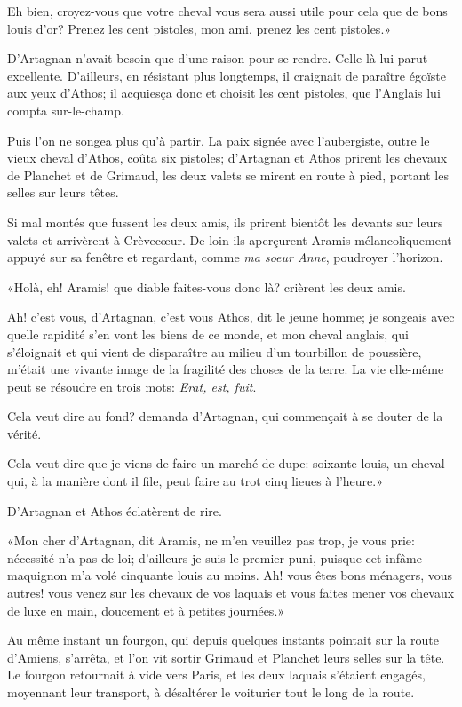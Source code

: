\speak  Eh bien, croyez-vous que votre cheval vous sera aussi utile pour cela que de bons louis d'or? Prenez les cent pistoles, mon ami, prenez les cent pistoles.» 

D'Artagnan n'avait besoin que d'une raison pour se rendre. Celle-là lui parut excellente. D'ailleurs, en résistant plus longtemps, il craignait de paraître égoïste aux yeux d'Athos; il acquiesça donc et choisit les cent pistoles, que l'Anglais lui compta sur-le-champ. 

Puis l'on ne songea plus qu'à partir. La paix signée avec l'aubergiste, outre le vieux cheval d'Athos, coûta six pistoles; d'Artagnan et Athos prirent les chevaux de Planchet et de Grimaud, les deux valets se mirent en route à pied, portant les selles sur leurs têtes. 

Si mal montés que fussent les deux amis, ils prirent bientôt les devants sur leurs valets et arrivèrent à Crèvecœur. De loin ils aperçurent Aramis mélancoliquement appuyé sur sa fenêtre et regardant, comme \textit{ma soeur Anne}, poudroyer l'horizon. 

«Holà, eh! Aramis! que diable faites-vous donc là? crièrent les deux amis. 

\speak  Ah! c'est vous, d'Artagnan, c'est vous Athos, dit le jeune homme; je songeais avec quelle rapidité s'en vont les biens de ce monde, et mon cheval anglais, qui s'éloignait et qui vient de disparaître au milieu d'un tourbillon de poussière, m'était une vivante image de la fragilité des choses de la terre. La vie elle-même peut se résoudre en trois mots: \textit{Erat, est, fuit}. 

\speak  Cela veut dire au fond? demanda d'Artagnan, qui commençait à se douter de la vérité. 

\speak  Cela veut dire que je viens de faire un marché de dupe: soixante louis, un cheval qui, à la manière dont il file, peut faire au trot cinq lieues à l'heure.» 

D'Artagnan et Athos éclatèrent de rire. 

«Mon cher d'Artagnan, dit Aramis, ne m'en veuillez pas trop, je vous prie: nécessité n'a pas de loi; d'ailleurs je suis le premier puni, puisque cet infâme maquignon m'a volé cinquante louis au moins. Ah! vous êtes bons ménagers, vous autres! vous venez sur les chevaux de vos laquais et vous faites mener vos chevaux de luxe en main, doucement et à petites journées.» 

Au même instant un fourgon, qui depuis quelques instants pointait sur la route d'Amiens, s'arrêta, et l'on vit sortir Grimaud et Planchet leurs selles sur la tête. Le fourgon retournait à vide vers Paris, et les deux laquais s'étaient engagés, moyennant leur transport, à désaltérer le voiturier tout le long de la route. 


